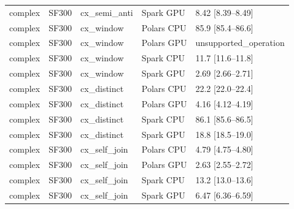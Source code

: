 \begin{longtable}{lllll}
complex & SF300 & cx\_semi\_anti & Spark GPU & 8.42 [8.39--8.49] \\
complex & SF300 & cx\_window & Polars CPU & 85.9 [85.4--86.6] \\
complex & SF300 & cx\_window & Polars GPU & unsupported\_operation \\
complex & SF300 & cx\_window & Spark CPU & 11.7 [11.6--11.8] \\
complex & SF300 & cx\_window & Spark GPU & 2.69 [2.66--2.71] \\
complex & SF300 & cx\_distinct & Polars CPU & 22.2 [22.0--22.4] \\
complex & SF300 & cx\_distinct & Polars GPU & 4.16 [4.12--4.19] \\
complex & SF300 & cx\_distinct & Spark CPU & 86.1 [85.6--86.5] \\
complex & SF300 & cx\_distinct & Spark GPU & 18.8 [18.5--19.0] \\
complex & SF300 & cx\_self\_join & Polars CPU & 4.79 [4.75--4.80] \\
complex & SF300 & cx\_self\_join & Polars GPU & 2.63 [2.55--2.72] \\
complex & SF300 & cx\_self\_join & Spark CPU & 13.2 [13.0--13.6] \\
complex & SF300 & cx\_self\_join & Spark GPU & 6.47 [6.36--6.59] \\
\end{longtable}

